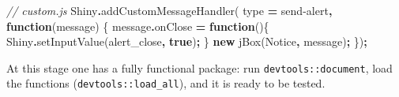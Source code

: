 \documentclass[
]{krantz}
\makeatletter
\newenvironment{Shaded}{\begin{snugshade}}{\end{snugshade}}
\newcommand{\AttributeTok}[1]{\textcolor[rgb]{0.61,0.61,0.61}{#1}}
\newcommand{\CommentTok}[1]{\textcolor[rgb]{0.37,0.37,0.37}{\textit{#1}}}
\newcommand{\ControlFlowTok}[1]{\textcolor[rgb]{0.27,0.27,0.27}{\textbf{#1}}}
\newcommand{\FunctionTok}[1]{\textcolor[rgb]{0,0,0}{#1}}
\newcommand{\KeywordTok}[1]{\textcolor[rgb]{0.27,0.27,0.27}{\textbf{#1}}}
\newcommand{\NormalTok}[1]{#1}
\newcommand{\OperatorTok}[1]{\textcolor[rgb]{0.43,0.43,0.43}{\textbf{#1}}}
\newcommand{\StringTok}[1]{\textcolor[rgb]{0.5,0.5,0.5}{#1}}
\newenvironment{kframe}{%
\medskip{}
\setlength{\fboxsep}{.8em}
 \def\at@end@of@kframe{}%
 \ifinner\ifhmode%
  \def\at@end@of@kframe{\end{minipage}}%
  \begin{minipage}{\columnwidth}%
 \fi\fi%
 \def\FrameCommand##1{\hskip\@totalleftmargin \hskip-\fboxsep
 \colorbox{shadecolor}{##1}\hskip-\fboxsep
     \hskip-\linewidth \hskip-\@totalleftmargin \hskip\columnwidth}%
 \MakeFramed {\advance\hsize-\width
   \@totalleftmargin\z@ \linewidth\hsize
   \@setminipage}}%
 {\par\unskip\endMakeFramed%
 \at@end@of@kframe}
\renewenvironment{Shaded}{\begin{kframe}}{\end{kframe}}
\makeatother
\begin{document}
\begin{Shaded}
\begin{Highlighting}[]
\CommentTok{// custom.js}
\NormalTok{Shiny}\OperatorTok{.}\FunctionTok{addCustomMessageHandler}\NormalTok{(}
\NormalTok{  type }\OperatorTok{=} \StringTok{\textquotesingle{}send{-}alert\textquotesingle{}}\OperatorTok{,} \KeywordTok{function}\NormalTok{(message) \{}
\NormalTok{    message}\OperatorTok{.}\AttributeTok{onClose} \OperatorTok{=} \KeywordTok{function}\NormalTok{()\{}
\NormalTok{      Shiny}\OperatorTok{.}\FunctionTok{setInputValue}\NormalTok{(}\StringTok{\textquotesingle{}alert\_close\textquotesingle{}}\OperatorTok{,} \KeywordTok{true}\NormalTok{)}\OperatorTok{;}
\NormalTok{    \}}
    \KeywordTok{new}\NormalTok{ jBox(}\StringTok{\textquotesingle{}Notice\textquotesingle{}}\OperatorTok{,}\NormalTok{ message)}\OperatorTok{;}
\NormalTok{\})}\OperatorTok{;}
\end{Highlighting}
\end{Shaded}

At this stage one has a fully functional package: run \texttt{devtools::document}, load the functions (\texttt{devtools::load\_all}), and it is ready to be tested.

\begin{Shaded}
\end{Shaded}
\end{document}
